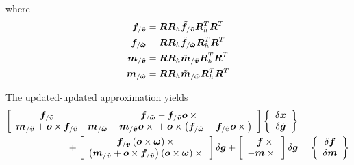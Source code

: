 where
\begin{subequations}
\begin{align}
	\bm{f}_{/\tilde{\bm{v}}}
	&=
	\bm{R} \bm{R}_h \tilde{\bm{f}}_{/\tilde{\bm{v}}} \bm{R}_h^T \bm{R}^T
	\\
	\bm{f}_{/\tilde{\bm{\omega}}}
	&=
	\bm{R} \bm{R}_h \tilde{\bm{f}}_{/\tilde{\bm{\omega}}} \bm{R}_h^T \bm{R}^T
	\\
	\bm{m}_{/\tilde{\bm{v}}}
	&=
	\bm{R} \bm{R}_h \tilde{\bm{m}}_{/\tilde{\bm{v}}} \bm{R}_h^T \bm{R}^T
	\\
	\bm{m}_{/\tilde{\bm{\omega}}}
	&=
	\bm{R} \bm{R}_h \tilde{\bm{m}}_{/\tilde{\bm{\omega}}} \bm{R}_h^T \bm{R}^T
\end{align}
\end{subequations}

The updated-updated approximation yields
\begin{align}
	\sqbr{\matr{cc}{
		\T{f}_{/\tilde{\T{v}}}
			& \T{f}_{/\tilde{\T{\omega}}}
			- \T{f}_{/\tilde{\T{v}}}\T{o}\times{}
		\\
%
		\T{m}_{/\tilde{\T{v}}}
		+ \T{o}\times\T{f}_{/\tilde{\T{v}}}
			&
			\T{m}_{/\tilde{\T{\omega}}}
			- \T{m}_{/\tilde{\T{v}}}\T{o}\times{}
			+ \T{o}\times\plbr{
				\T{f}_{/\tilde{\T{\omega}}}
				- \T{f}_{/\tilde{\T{v}}}\T{o}\times{}
			}
	}} \cubr{\cvvect{
		\delta\dot{\T{x}} \\
		\delta\dot{\T{g}}
	}}
	& \nonumber \\ \mbox{}
	+ \sqbr{\matr{c}{
		\T{f}_{/\tilde{\T{v}}}\plbr{\T{o}\times\T{\omega}}\times{}
		\\
%
		\plbr{
			\T{m}_{/\tilde{\T{v}}} + \T{o}\times\T{f}_{/\tilde{\T{v}}}
		} \plbr{\T{o}\times\T{\omega}}\times{}
	}} \delta\T{g}
	+ \sqbr{\matr{c}{
		-\T{f} \times{}
		\\
%
		-\T{m}\times{}
	}} \delta\T{g}
	&=
	\cubr{\cvvect{
		\delta\T{f} \\
		\delta\T{m}
	}}
\end{align}

